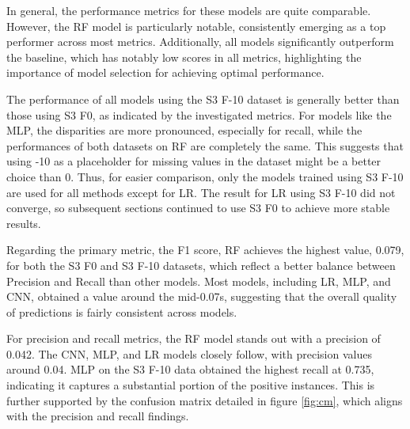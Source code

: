 \documentclass[a4paper,11pt]{report}
\begin{document}
In general, the performance metrics for these models are quite comparable. However, the RF model is particularly notable, consistently emerging as a top performer across most metrics. Additionally, all models significantly outperform the baseline, which has notably low scores in all metrics, highlighting the importance of model selection for achieving optimal performance.

The performance of all models using the S3 F-10 dataset is generally better than those using S3 F0, as indicated by the investigated metrics. For models like the MLP, the disparities are more pronounced, especially for recall, while the performances of both datasets on RF are completely the same. This suggests that using -10 as a placeholder for missing values in the dataset might be a better choice than 0. Thus, for easier comparison, only the models trained using S3 F-10 are used for all methods except for LR. The result for LR using S3 F-10 did not converge, so subsequent sections continued to use S3 F0 to achieve more stable results.

Regarding the primary metric, the F1 score, RF achieves the highest value, 0.079, for both the S3 F0 and S3 F-10 datasets, which reflect a better balance between Precision and Recall than other models. Most models, including LR, MLP, and CNN, obtained a value around the mid-0.07s, suggesting that the overall quality of predictions is fairly consistent across models.

For precision and recall metrics, the RF model stands out with a precision of 0.042. The CNN, MLP, and LR models closely follow, with precision values around 0.04. MLP on the S3 F-10 data obtained the highest recall at 0.735, indicating it captures a substantial portion of the positive instances. This is further supported by the confusion matrix detailed in figure \ref{fig:cm}, which aligns with the precision and recall findings.
\end{document}

